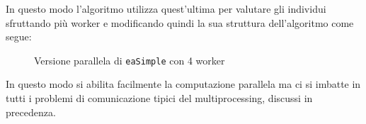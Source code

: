 In questo modo l'algoritmo utilizza quest'ultima per valutare gli individui
sfruttando più worker e modificando quindi la sua struttura dell'algoritmo come
segue:

\begin{figure}[H]
	\centering
	
	\caption{Versione parallela di \lstinline|eaSimple| con 4 worker}
	\label{fig: parallel_eaSimple}
\end{figure}

In questo modo si abilita facilmente la computazione parallela ma ci si imbatte
in tutti i problemi di comunicazione tipici del multiprocessing, discussi in
precedenza.
